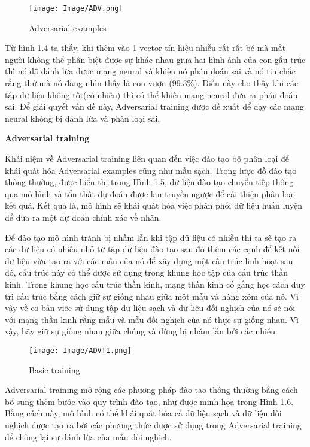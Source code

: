 \begin{figure}[h!]
    \centering
    \texttt{[image: Image/ADV.png]}
    \caption{Adversarial examples}
    \label{Hình 1.4: Adversarial examples}
    \cite*{Reference7}
\end{figure}

Từ hình 1.4 ta thấy, khi thêm vào 1 vector tín hiệu nhiễu rất rất bé mà mắt người không thể phân biệt được sự khác nhau giữa hai hình ảnh của con gấu trúc thì nó đã đánh lừa được mạng neural và khiến nó phán đoán sai và nó tin chắc rằng
thứ mà nó đang nhìn thấy là con vượn (99.3\%). Điều này cho thấy khi các tập dữ liệu không tốt(có nhiễu) thì có thể khiến mạng neural đưa ra phán đoán sai.
 Để giải quyết vấn đề này, Adversarial training được đề xuất để dạy các mạng neural không bị đánh lừa và phân loại sai. 

\cite*{Reference6}
\textbf{Adversarial training}

Khái niệm về Adversarial training liên quan đến việc đào tạo bộ phân loại để khái quát hóa
Adversarial examples cũng như mẫu sạch. Trong lược đồ đào tạo thông thường, được hiển thị trong Hình 1.5, dữ liệu đào tạo chuyển tiếp
thông qua mô hình và tổn thất dự đoán được lan truyền ngược để cải thiện phân loại
kết quả. Kết quả là, mô hình sẽ khái quát hóa việc phân phối dữ liệu huấn luyện để
đưa ra một dự đoán chính xác về nhãn. 

Để đào tạo mô hình tránh bị nhầm lẫn khi tập dữ liệu có nhiễu thì ta sẽ tạo ra các dữ liệu có nhiễu nhỏ từ tập dữ liệu đào tạo
sau đó thêm các cạnh để kết nối dữ liệu vừa tạo ra với các mẫu của nó để xây dựng một cấu trúc linh hoạt sau đó, cấu trúc này có thể được sử dụng trong khung học tập
của cấu trúc thần kinh. Trong khung học cấu trúc thần kinh, mạng thần kinh cố gắng học cách duy trì cấu trúc bằng cách giữ sự giống nhau giữa một mẫu và hàng xóm của nó.
 Vì vậy về cơ bản việc sử dụng tập dữ liệu sạch và dữ liệu đối nghịch của nó sẽ nói với mạng thần kinh rằng mẫu và mẫu đối nghịch của nó thực sự giống nhau. Vì vậy, hãy giữ sự 
 giống nhau giữa chúng và đừng bị nhầm lẫn bởi các nhiễu.

\begin{figure}[h!]
    \centering
    \texttt{[image: Image/ADVT1.png]}
    \caption{Basic training}
    \label{Hình 1.5: Adversarial training}
    \cite*{Reference8}
\end{figure}

Adversarial training mở rộng các phương pháp đào tạo thông thường bằng cách bổ sung thêm
bước vào quy trình đào tạo, như được minh họa trong Hình 1.6. Bằng cách này, mô hình có thể
khái quát hóa cả dữ liệu sạch và dữ liệu đối nghịch được tạo ra bởi các phương thức
được sử dụng trong Adversarial training để chống lại sự đánh lừa của mẫu đối nghịch.

